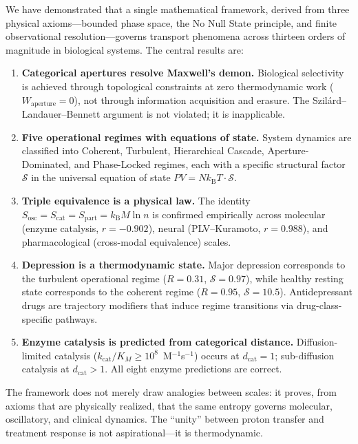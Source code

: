 \documentclass[twocolumn,10pt]{article}
\newcommand{\Sosc}{S_{\mathrm{osc}}}
\newcommand{\Scat}{S_{\mathrm{cat}}}
\newcommand{\Spart}{S_{\mathrm{part}}}
\newcommand{\kB}{k_{\mathrm{B}}}
\newcommand{\dcat}{d_{\mathrm{cat}}}
\newcommand{\Rorder}{R}
\begin{document}
We have demonstrated that a single mathematical framework, derived from three physical axioms---bounded phase space, the No Null State principle, and finite observational resolution---governs transport phenomena across thirteen orders of magnitude in biological systems.  The central results are:

\begin{enumerate}
  \item \textbf{Categorical apertures resolve Maxwell's demon.}  Biological selectivity is achieved through topological constraints at zero thermodynamic work ($W_{\mathrm{aperture}} = 0$), not through information acquisition and erasure.  The Szil\'ard--Landauer--Bennett argument is not violated; it is inapplicable.

  \item \textbf{Five operational regimes with equations of state.}  System dynamics are classified into Coherent, Turbulent, Hierarchical Cascade, Aperture-Dominated, and Phase-Locked regimes, each with a specific structural factor $\mathcal{S}$ in the universal equation of state $PV = N\kB T \cdot \mathcal{S}$.

  \item \textbf{Triple equivalence is a physical law.}  The identity $\Sosc = \Scat = \Spart = \kB M \ln n$ is confirmed empirically across molecular (enzyme catalysis, $r = -0.902$), neural (PLV--Kuramoto, $r = 0.988$), and pharmacological (cross-modal equivalence) scales.

  \item \textbf{Depression is a thermodynamic state.}  Major depression corresponds to the turbulent operational regime ($\Rorder = 0.31$, $\mathcal{S} = 0.97$), while healthy resting state corresponds to the coherent regime ($\Rorder = 0.95$, $\mathcal{S} = 10.5$).  Antidepressant drugs are trajectory modifiers that induce regime transitions via drug-class-specific pathways.

  \item \textbf{Enzyme catalysis is predicted from categorical distance.}  Diffusion-limited catalysis ($k_{\mathrm{cat}}/K_{M} \geq 10^{8}$~M$^{-1}$s$^{-1}$) occurs at $\dcat = 1$; sub-diffusion catalysis at $\dcat > 1$.  All eight enzyme predictions are correct.
\end{enumerate}

The framework does not merely draw analogies between scales: it proves, from axioms that are physically realized, that the same entropy governs molecular, oscillatory, and clinical dynamics.  The ``unity'' between proton transfer and treatment response is not aspirational---it is thermodynamic.
\end{document}
